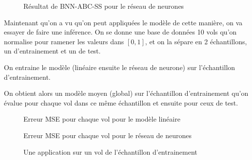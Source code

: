 \documentclass[french,12pt]{article}
\begin{document}
\begin{figure}[H]
    \centering
    \caption{Résultat de BNN-ABC-SS pour le réseau de neurones}
\end{figure}

Maintenant qu'on a vu qu'on peut appliquées le modèle de cette manière, on va essayer de faire une inférence.
On se donne une base de données 10 vols qu'on normalise pour ramener les valeurs dans $[0,1]$,
et on la sépare en 2 échantillons, un d'entrainement et un de test.

On entraine le modèle (linéaire ensuite le réseau de neurone) sur l'échantillon d'entrainement. 

\begin{figure}[H]
    \centering
    \caption{}
\end{figure}


On obtient alors un modèle moyen (global) sur l'échantillon d'entrainement
qu'on évalue pour chaque vol dans ce même échantillon et ensuite pour ceux 
de test.

\begin{figure}[H]
    \centering
    \caption{Erreur MSE pour chaque vol pour le modèle linéaire}
\end{figure}

\begin{figure}[H]
    \centering
    \caption{Erreur MSE pour chaque vol pour le réseau de neurones}
\end{figure}


\begin{figure}[H]
    \centering
    \caption{Une application sur un vol de l'échantillon d'entrainement}
\end{figure}
\end{document}
